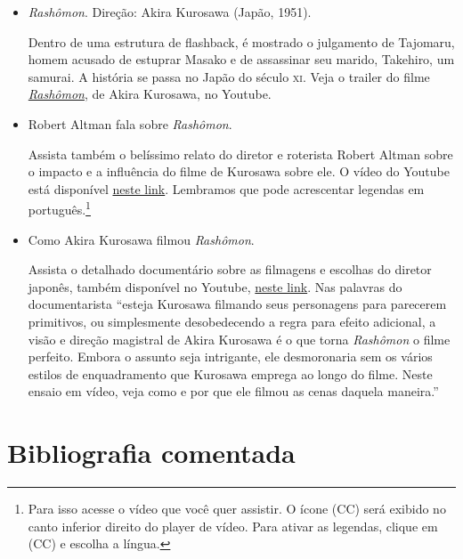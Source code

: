 \documentclass[12pt]{extarticle}
\begin{document}
\begin{itemize} 

\item\emph{Rashômon}. Direção: Akira Kurosawa (Japão, 1951).

Dentro de uma estrutura de flashback, é mostrado o julgamento de Tajomaru,
homem acusado de estuprar Masako e de assassinar seu marido, Takehiro, um
samurai. A história se passa no Japão do século \textsc{xi}. Veja o trailer 
do filme \href{https://www.youtube.com/watch?v=WKd4tIHB064}{\emph{Rashômon}}, 
de Akira Kurosawa, no Youtube.

\item Robert Altman fala sobre \emph{Rashômon}.

Assista também o belíssimo relato do diretor e roterista Robert Altman 
sobre o impacto e a influência do filme de Kurosawa sobre ele. 
O vídeo do Youtube está disponível \href{https://www.youtube.com/watch?v=oYWQa0GExt8}{neste link}. 
Lembramos que pode acrescentar legendas em 
português.\footnote{Para isso acesse o vídeo que você quer assistir.
O ícone (CC) será exibido no canto inferior direito do player de vídeo.
Para ativar as legendas, clique em (CC) e escolha a língua.}

\item Como Akira Kurosawa filmou \emph{Rashômon}. 

Assista o detalhado documentário sobre as filmagens e escolhas do 
diretor japonês, também disponível no Youtube, 
\href{https://www.youtube.com/watch?v=-tkDU0_r8dU}{neste link}.
Nas palavras do documentarista ``esteja Kurosawa 
filmando seus personagens para parecerem primitivos, 
ou simplesmente desobedecendo a regra para efeito adicional, 
a visão e direção magistral de Akira Kurosawa é o que torna \emph{Rashômon} 
o filme perfeito. Embora o assunto seja intrigante, ele desmoronaria 
sem os vários estilos de enquadramento que Kurosawa emprega ao longo 
do filme. Neste ensaio em vídeo, veja como e por que ele filmou 
as cenas daquela maneira.''
\end{itemize}

\section{Bibliografia comentada}
\end{document}
